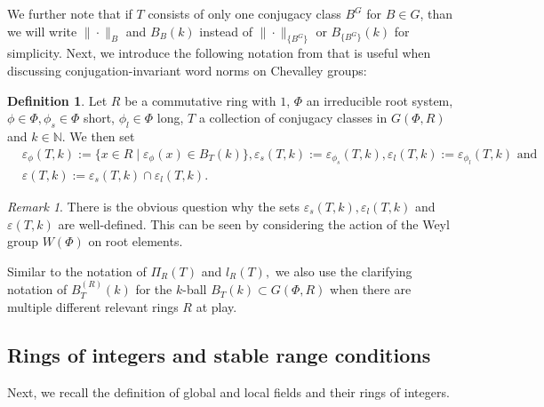 \documentclass[12pt]{amsart}
\theoremstyle{definition}\newtheorem{definition}[theorem]{Definition}
\theoremstyle{remark}\newtheorem{remark}[theorem]{Remark}
\theoremstyle{definition}\newtheorem{case}{Case}
\begin{document}
We further note that if $T$ consists of only one conjugacy class $B^G$ for $B\in G$, than we will write $\|\cdot\|_B$ and $B_B(k)$ instead of $\|\cdot\|_{\{B^G\}}$ or $B_{\{B^G\}}(k)$ for simplicity. Next, we introduce the following notation from \cite{KLM,General_strong_bound} that is useful when discussing conjugation-invariant word norms on Chevalley groups:

\begin{definition}
Let $R$ be a commutative ring with $1$, $\Phi$ an irreducible root system, $\phi\in\Phi, \phi_s\in\Phi$ short, $\phi_l\in\Phi$ long, $T$ a collection of conjugacy classes in $G(\Phi,R)$ and $k\in\mathbb{N}.$ We then set 
\begin{align*}
&\varepsilon_{\phi}(T,k):=\{x\in R\mid\varepsilon_{\phi}(x)\in B_T(k)\},\varepsilon_s(T,k):=\varepsilon_{\phi_s}(T,k),\varepsilon_l(T,k):=\varepsilon_{\phi_l}(T,k)\text{ and }\\
&\varepsilon(T,k):=\varepsilon_s(T,k)\cap\varepsilon_l(T,k).
\end{align*}
\end{definition}

\begin{remark}
There is the obvious question why the sets $\varepsilon_s(T,k),\varepsilon_l(T,k)$ and $\varepsilon(T,k)$ are well-defined. This can be  seen by considering the action of the Weyl group $W(\Phi)$ on root elements.
\end{remark}

Similar to the notation of $\Pi_R(T)$ and $l_R(T),$ we also use the clarifying notation of $B_T^{(R)}(k)$ for the $k$-ball $B_T(k)\subset G(\Phi,R)$ when there are multiple different relevant rings $R$ at play. 

\subsection{Rings of integers and stable range conditions}

Next, we recall the definition of global and local fields and their rings of integers. 
\end{document}
